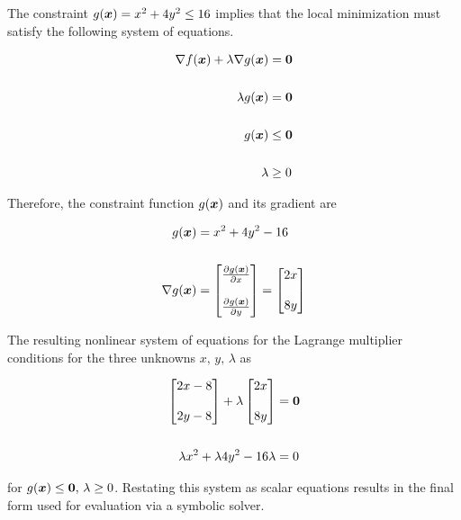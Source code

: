 The constraint $g(\boldsymbol{x}) = x^2 + 4y^2 \leq 16$ implies that the local minimization must satisfy the following system of equations. 

\begin{align*}
	\nabla f(\boldsymbol{x}) + \lambda \nabla g(\boldsymbol{x}) &= \boldsymbol{0} \\
	\\
	\lambda g(\boldsymbol{x}) &= \boldsymbol{0} \\
	\\
	g(\boldsymbol{x}) &\leq \boldsymbol{0} \\
	\\
	\lambda &\geq 0
\end{align*}

Therefore, the constraint function $g(\boldsymbol{x})$ and its gradient are

\begin{align*}
	g(\boldsymbol{x}) &= x^2 + 4y^2 - 16 \\
	\\
	\nabla g (\boldsymbol{x}) &= \begin{bmatrix} \frac{\partial g (\boldsymbol{x})}{\partial x} \\ \\ \frac{\partial g (\boldsymbol{x})}{\partial y} \end{bmatrix} = \begin{bmatrix} 2x \\ \\ 8y \end{bmatrix}
\end{align*}

The resulting nonlinear system of equations for the Lagrange multiplier conditions for the three unknowns $x, \, y, \, \lambda$ as

\begin{align*}
	\begin{bmatrix} 2 x - 8 \\ \\ 2 y - 8 \end{bmatrix} + \lambda \begin{bmatrix} 2x \\ \\ 8y \end{bmatrix} &= \boldsymbol{0} \\
	\\
	\lambda x^2 + \lambda 4 y^2 - 16 \lambda &= 0 
\end{align*}

for $g(\boldsymbol{x}) \leq \boldsymbol{0}, \, \lambda \geq 0$. Restating this system as scalar equations results in the final form used for evaluation via a symbolic solver. 

